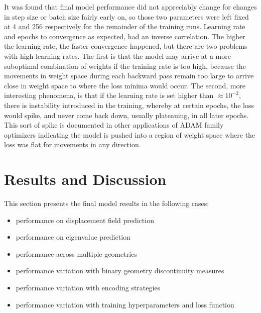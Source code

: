 \documentclass[preprint,review,12pt]{elsarticle}
\begin{document}
It was found that final model performance did not appreciably change for changes in step size or batch size fairly early on, so those two parameters were left fixed at 4 and 256 respectively for the remainder of the training runs. Learning rate and epochs to convergence as expected, had an inverse correlation. The higher the learning rate, the faster convergence happened, but there are two problems with high learning rates. The first is that the model may arrive at a more suboptimal combination of weights if the training rate is too high, because the movements in weight space during each backward pass remain too large to arrive close in weight space to where the loss minima would occur. The second, more interesting phenomena, is that if the learning rate is set higher than $\approx 10^{-2}$, there is instability introduced in the training, whereby at certain epochs, the loss would spike, and never come back down, usually plateauing, in all later epochs. This sort of spike is documented in other applications of ADAM family optimizers indicating the model is pushed into a region of weight space where the loss was flat for movements in any direction.

\section{Results and Discussion}
This section presents the final model results in the following cases:
\begin{itemize}
    \item performance on displacement field prediction
    \item performance on eigenvalue prediction
    \item performance across multiple geometries
    \item performance variation with binary geometry discontinuity measures
    \item performance variation with encoding strategies
    \item performance variation with training hyperparameters and loss function
\end{itemize}


\end{document}
